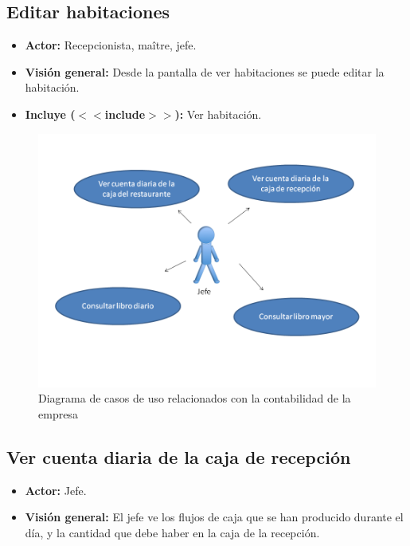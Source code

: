 \documentclass[spanish,a4paper,11pt, twoside]{report}	%
\begin{document}
	\subsection{Editar habitaciones}
		\begin{itemize}
			\item \textbf{Actor:} Recepcionista, maître, jefe.
			\item \textbf{Visión general:} Desde la pantalla de ver habitaciones se puede editar la habitación.	
			\item \textbf{Incluye ($<<$include$>>$):} Ver habitación.
		\end {itemize}

	\begin{figure}[!h]
		\centering
		\includegraphics[scale=0.5]{Contabilidad.png}
		\caption{Diagrama de casos de uso relacionados con la contabilidad de la empresa}
	\end{figure}

	
	\subsection{Ver cuenta diaria de la caja de recepción}
		\begin{itemize}
			\item \textbf{Actor:} Jefe.
			\item \textbf{Visión general:} El jefe ve los flujos de caja que se han producido durante el día, 
				y la cantidad que debe haber en la caja de la recepción.	
		\end {itemize}
\end{document}
